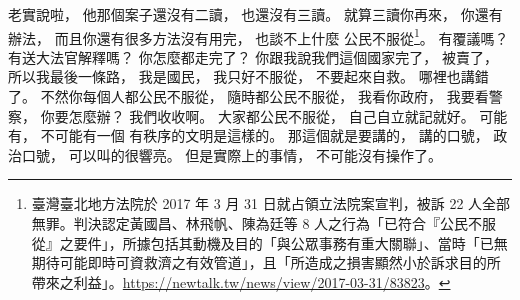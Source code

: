 \hypertarget{w01:cue:3162}{}老實說啦，
\hypertarget{w01:cue:3163}{}他那個案子還沒有二讀，
\hypertarget{w01:cue:3164}{}也還沒有三讀。
\hypertarget{w01:cue:3165}{}就算三讀你再來，
\hypertarget{w01:cue:3166}{}你還有辦法，
\hypertarget{w01:cue:3167}{}而且你還有很多方法沒有用完，
\hypertarget{w01:cue:3168}{}也談不上什麼
\hypertarget{w01:cue:3169}{}公民不服從\footnote{臺灣臺北地方法院於 2017 年 3 月 31 日就占領立法院案宣判，被訴 22 人全部無罪。判決認定黃國昌、林飛帆、陳為廷等 8 人之行為「已符合『公民不服從』之要件」，所據包括其動機及目的「與公眾事務有重大關聯」、當時「已無期待可能即時可資救濟之有效管道」，且「所造成之損害顯然小於訴求目的所帶來之利益」。\url{https://newtalk.tw/news/view/2017-03-31/83823}。}。
\hypertarget{w01:cue:3170}{}有覆議嗎？
\hypertarget{w01:cue:3171}{}有送大法官解釋嗎？
\hypertarget{w01:cue:3172}{}你怎麼都走完了？
\hypertarget{w01:cue:3173}{}你跟我說我們這個國家完了，
\hypertarget{w01:cue:3174}{}被賣了，
\hypertarget{w01:cue:3175}{}所以我最後一條路，
\hypertarget{w01:cue:3176}{}我是國民，
\hypertarget{w01:cue:3177}{}我只好不服從，
\hypertarget{w01:cue:3178}{}不要起來自救。
\hypertarget{w01:cue:3179}{}哪裡也講錯了。
\hypertarget{w01:cue:3180}{}不然你每個人都公民不服從，
\hypertarget{w01:cue:3181}{}隨時都公民不服從，
\hypertarget{w01:cue:3182}{}我看你政府，
\hypertarget{w01:cue:3183}{}我要看警察，
\hypertarget{w01:cue:3184}{}你要怎麼辦？
\hypertarget{w01:cue:3185}{}我們收收啊。
\hypertarget{w01:cue:3186}{}大家都公民不服從，
\hypertarget{w01:cue:3187}{}自己自立就記就好。
\hypertarget{w01:cue:3188}{}可能有，
\hypertarget{w01:cue:3189}{}不可能有一個
\hypertarget{w01:cue:3190}{}有秩序的文明是這樣的。
\hypertarget{w01:cue:3191}{}那這個就是要講的，
\hypertarget{w01:cue:3192}{}講的口號，
\hypertarget{w01:cue:3193}{}政治口號，
\hypertarget{w01:cue:3194}{}可以叫的很響亮。
\hypertarget{w01:cue:3195}{}但是實際上的事情，
\hypertarget{w01:cue:3196}{}不可能沒有操作了。

